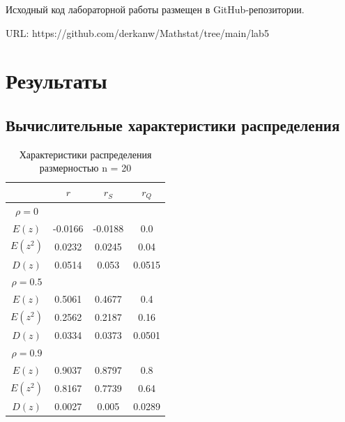 \documentclass[12pt,a4paper]{article}
\begin{document}
Исходный код лабораторной работы размещен в GitHub-репозитории.

URL: https://github.com/derkanw/Mathstat/tree/main/lab5

\section {Результаты}
\subsection{Вычислительные характеристики распределения}
\begin{table}[H]
    \centering
    \begin{tabular}{|c|c|c|c|}
        \hline
        & $r$ & $r_S$ & $r_Q$\\\hline
        $\rho=0$ & & &\\\hline
        $E(z)$ & -0.0166 & -0.0188 & 0.0\\\hline
        $E(z^2)$ & 0.0232 & 0.0245 & 0.04\\\hline
        $D(z)$ & 0.0514 & 0.053 & 0.0515\\\hline
        \hline
        $\rho=0.5$ & & &\\\hline
        $E(z)$ & 0.5061 & 0.4677 & 0.4\\\hline
        $E(z^2)$ & 0.2562 & 0.2187 & 0.16\\\hline
        $D(z)$ & 0.0334 & 0.0373 & 0.0501\\\hline
        \hline
        $\rho=0.9$ & & &\\\hline
        $E(z)$ & 0.9037 & 0.8797 & 0.8\\\hline
        $E(z^2)$ & 0.8167 & 0.7739 & 0.64\\\hline
        $D(z)$ & 0.0027 & 0.005 & 0.0289\\\hline
    \end{tabular}
    \caption{Характеристики распределения размерностью n = 20}
\end{table}
\end{document}
